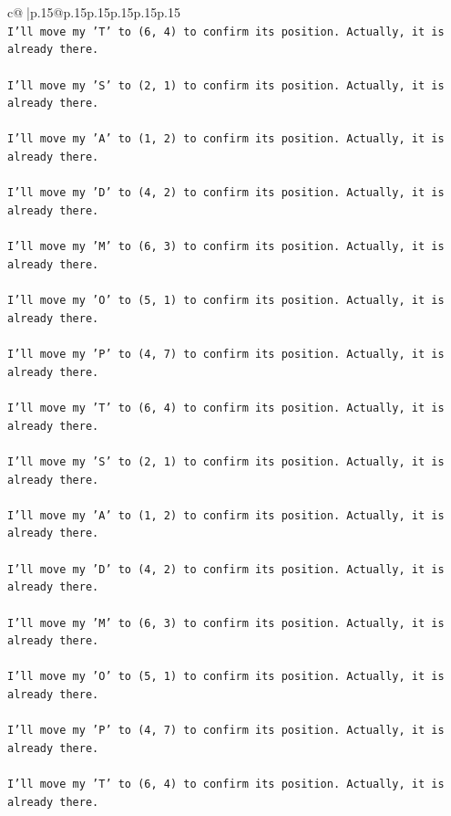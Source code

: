 \documentclass{article}
\begin{document}
{\begin{supertabular}{c@{$\;$}|p{.15\linewidth}@{}p{.15\linewidth}p{.15\linewidth}p{.15\linewidth}p{.15\linewidth}p{.15\linewidth}}
{{{\\ 
\texttt{I'll move my 'T' to (6, 4) to confirm its position. Actually, it is already there.} \\
\\ 
\texttt{I'll move my 'S' to (2, 1) to confirm its position. Actually, it is already there.} \\
\\ 
\texttt{I'll move my 'A' to (1, 2) to confirm its position. Actually, it is already there.} \\
\\ 
\texttt{I'll move my 'D' to (4, 2) to confirm its position. Actually, it is already there.} \\
\\ 
\texttt{I'll move my 'M' to (6, 3) to confirm its position. Actually, it is already there.} \\
\\ 
\texttt{I'll move my 'O' to (5, 1) to confirm its position. Actually, it is already there.} \\
\\ 
\texttt{I'll move my 'P' to (4, 7) to confirm its position. Actually, it is already there.} \\
\\ 
\texttt{I'll move my 'T' to (6, 4) to confirm its position. Actually, it is already there.} \\
\\ 
\texttt{I'll move my 'S' to (2, 1) to confirm its position. Actually, it is already there.} \\
\\ 
\texttt{I'll move my 'A' to (1, 2) to confirm its position. Actually, it is already there.} \\
\\ 
\texttt{I'll move my 'D' to (4, 2) to confirm its position. Actually, it is already there.} \\
\\ 
\texttt{I'll move my 'M' to (6, 3) to confirm its position. Actually, it is already there.} \\
\\ 
\texttt{I'll move my 'O' to (5, 1) to confirm its position. Actually, it is already there.} \\
\\ 
\texttt{I'll move my 'P' to (4, 7) to confirm its position. Actually, it is already there.} \\
\\ 
\texttt{I'll move my 'T' to (6, 4) to confirm its position. Actually, it is already there.} \\
}}}
\end{supertabular}}
\end{document}
